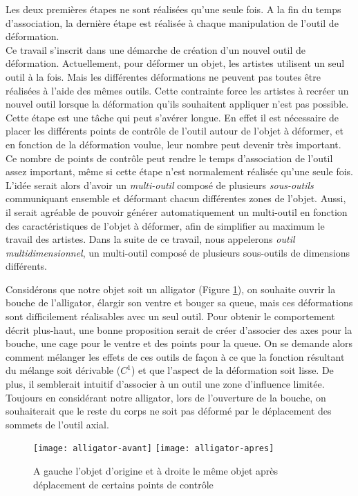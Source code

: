 Les deux premières étapes ne sont réalisées qu'une seule fois. A la fin du temps
d'association, la dernière étape est réalisée à chaque manipulation de l'outil
de déformation. \\

Ce travail s'inscrit dans une démarche de création d'un nouvel outil de
déformation. Actuellement, pour déformer un objet, les artistes utilisent un
seul outil à la fois. Mais les différentes déformations ne peuvent pas toutes
être réalisées à l'aide des mêmes outils. Cette contrainte force les artistes à
recréer un nouvel outil lorsque la déformation qu'ils souhaitent appliquer n'est
pas possible. Cette étape est une tâche qui peut s'avérer longue. En effet il
est nécessaire de placer les différents points de contrôle de l'outil autour de
l'objet à déformer, et en fonction de la déformation voulue, leur nombre peut
devenir très important. Ce nombre de points de contrôle peut rendre le temps
d'association de l'outil assez important, même si cette étape n'est normalement
réalisée qu'une seule fois. L'idée serait alors d'avoir un \textit{multi-outil}
composé de plusieurs \textit{sous-outils} communiquant ensemble et déformant
chacun différentes zones de l'objet. Aussi, il serait agréable de pouvoir
générer automatiquement un multi-outil en fonction des caractéristiques de
l'objet à déformer, afin de simplifier au maximum le travail des artistes. Dans
la suite de ce travail, nous appelerons \textit{outil multidimensionnel}, un
multi-outil composé de plusieurs sous-outils de dimensions différents.

Considérons que notre objet soit un alligator (Figure \ref{INTall}), on souhaite
ouvrir la bouche de l'alligator, élargir son ventre et bouger sa queue, mais ces
déformations sont difficilement réalisables avec un seul outil. Pour obtenir le
comportement décrit plus-haut, une bonne proposition serait de créer d'associer
des axes pour la bouche, une cage pour le ventre et des points pour la queue. On
se demande alors comment mélanger les effets de ces outils de façon à ce que la
fonction résultant du mélange soit dérivable ($C^1$) et que l'aspect de la
déformation soit lisse. De plus, il semblerait intuitif d'associer à un outil
une zone d'influence limitée. Toujours en considérant notre alligator, lors de
l'ouverture de la bouche, on souhaiterait que le reste du corps ne soit pas
déformé par le déplacement des sommets de l'outil axial. \\

\begin{figure}[h]
  \texttt{[image: alligator-avant]}
  \texttt{[image: alligator-apres]}
  \caption{A gauche l'objet d'origine et à droite le même objet après
    déplacement de certains points de contrôle}
  \label{INTall}
\end{figure}

